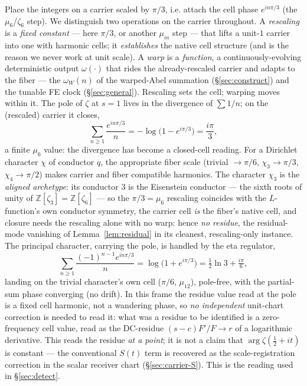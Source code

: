 \documentclass[11pt]{article}
\theoremstyle{definition}
\begin{document}
Place the integers on a carrier scaled by $\pi/3$, i.e. attach the cell phase $e^{in\pi/3}$ (the
$\mu_6$/$\zeta_6$ step). We distinguish two operations on the carrier throughout. A \emph{rescaling} is a
\emph{fixed constant} --- here $\pi/3$, or another $\mu_m$ step --- that lifts a unit-$1$ carrier into one
with harmonic cells; it \emph{establishes} the native cell structure (and is the reason we never work at
unit scale). A \emph{warp} is a \emph{function}, a continuously-evolving deterministic output
$\omega(\cdot)$ that rides the already-rescaled carrier and adapts to the fiber --- the $\omega_W(n)$ of the
warped-Abel summation (\S\ref{sec:construct}) and the tunable FE clock (\S\ref{sec:general}). Rescaling sets
the cell; warping moves within it. The pole of $\zeta$ at $s=1$ lives in the divergence of $\sum 1/n$; on
the (rescaled) carrier it closes,
\[
  \sum_{n\ge1}\frac{e^{in\pi/3}}{n}=-\log\!\big(1-e^{i\pi/3}\big)=\frac{i\pi}{3},
\]
a finite $\mu_6$ value: the divergence has become a closed-cell reading. For a Dirichlet character
$\chi$ of conductor $q$, the appropriate fiber scale (trivial $\to\pi/6$, $\chi_3\to\pi/3$,
$\chi_4\to\pi/2$) makes carrier and fiber compatible harmonics. The character $\chi_3$ is the
\emph{aligned archetype}: its conductor $3$ is the Eisenstein conductor --- the sixth roots of unity of
$\mathbb Z[\zeta_3]=\mathbb Z[\zeta_6]$ --- so the $\pi/3=\mu_6$ rescaling coincides with the $L$-function's
own conductor symmetry, the carrier cell \emph{is} the fiber's native cell, and closure needs the rescaling
alone with no warp: hence \emph{no residue}, the residual-mode vanishing of Lemma~\ref{lem:residual} in its
cleanest, rescaling-only instance. The principal character, carrying the
pole, is handled by the eta regulator,
\[
  \sum_{n\ge1}\frac{(-1)^{n-1}e^{in\pi/3}}{n}=\log\!\big(1+e^{i\pi/3}\big)=\tfrac12\ln3+\tfrac{i\pi}{6},
\]
landing on the trivial character's own cell ($\pi/6$, $\mu_{12}$), pole-free, with the partial-sum
phase converging (no drift). In this frame the residue value read at the pole is a fixed cell harmonic, not a
wandering phase, so \emph{no independent} unit-chart correction is needed to read it: what was a residue
to be identified is a zero-frequency cell value, read as the DC-residue $(s-c)F'/F\to r$ of a logarithmic
derivative. This reads the residue \emph{at a point}; it is not a claim that $\arg\zeta(\tfrac12+it)$ is
constant --- the conventional \(S(t)\) term is recovered as the scale-registration correction in the scalar receiver chart
(\S\ref{sec:carrier-S}). This is the reading used in \S\ref{sec:detect}.
\end{document}
